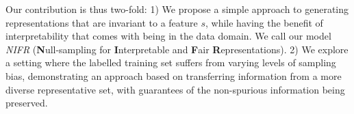 

Our contribution is thus two-fold:
1) We propose a simple approach to generating representations 
that are invariant to a feature $s$, while having the benefit of interpretability that comes with being in the data domain.
We call our model \emph{NIFR} (\textbf{N}ull-sampling for \textbf{I}nterpretable and \textbf{F}air \textbf{R}epresentations).
2) We explore a setting where the labelled training set suffers from varying levels of sampling bias,
demonstrating an approach based on transferring information from a more diverse representative set,
with guarantees of the non-spurious information being preserved.

